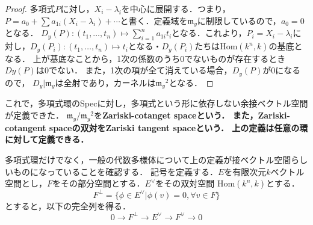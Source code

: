 \documentclass{ujarticle}
\begin{document}
\begin{proof}
 多項式$P$に対し，$X_i - \lambda_i$を中心に展開する．つまり，$P= a_0 + \sum a_{1i} (X_i -\lambda_i) + \cdots $と書く．定義域を$\mathfrak{m}_y$に制限しているので，$a_0=0$となる．
 $D_y(P):(t_1,\dots,t_n) \mapsto \sum_{i=1}^n a_{1i}t_i$となる．これより，$P_i=X_i - \lambda_i$に対し，$D_y(P_i):(t_1,\dots,t_n) \mapsto t_i$となる・$D_y(P_i)$たちは$\mathrm{Hom}(k^n,k)$の基底となる．
 上が基底なことから，1次の係数のうち0でないものが存在するとき$Dy(P)$は0でない．
 また，1次の項が全て消えている場合，$D_y(P)$が0になるので，
 $D_y|\mathfrak{m}_y$は全射であり，カーネルは${\mathfrak{m}_y}^2 $となる．
\end{proof}
これで，多項式環のSpecに対し，多項式という形に依存しない余接ベクトル空間が定義できた．
$\mathfrak{m}_y/{\mathfrak{m}_y}^2$を\bf{Zariski-cotanget space}という．
また，Zariski-cotangent spaceの双対をZariski tangent spaceという．
上の定義は任意の環に対して定義できる．

多項式環だけでなく，一般の代数多様体について上の定義が接ベクトル空間らしいものになっていることを確認する．
記号を定義する．$E$を有限次元$k$ベクトル空間とし，$F$をその部分空間とする．$ E^{\vee}$をその双対空間
$\mathrm{Hom}(k^n,k)$とする．
\begin{equation*}
  F^{\bot}= \{\phi \in E^{\vee}| \phi(v)=0, \forall v \in F \}
\end{equation*}
とすると，以下の完全列を得る．
\begin{equation*}
 0 \to F^{\bot} \to  E^{\vee} \to F^{\vee} \to 0
\end{equation*}
\end{document}

